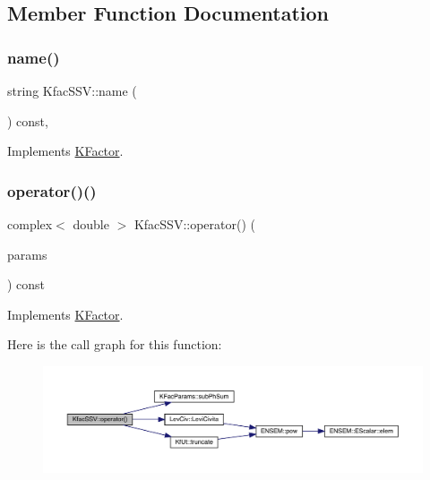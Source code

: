\subsection{Member Function Documentation}
\mbox{\label{classKfacSSV_a72d5e577525fa97365dbcfd4c5bea88d}} 
\subsubsection{\texorpdfstring{name()}{name()}}
{\footnotesize\ttfamily string Kfac\+S\+S\+V\+::name (\begin{DoxyParamCaption}{ }\end{DoxyParamCaption}) const\hspace{0.3cm}{\ttfamily [inline]}, {\ttfamily [virtual]}}



Implements \mbox{\hyperlink{classKFactor_ae578f8d6e4b525895427717da99cab6c}{K\+Factor}}.

\mbox{\label{classKfacSSV_ad9bddcf643847eebae9926bbc646c56c}} 
\subsubsection{\texorpdfstring{operator()()}{operator()()}}
{\footnotesize\ttfamily complex$<$ double $>$ Kfac\+S\+S\+V\+::operator() (\begin{DoxyParamCaption}\item[{const \mbox{\hyperlink{classKFacParams}{K\+Fac\+Params}} \&}]{params }\end{DoxyParamCaption}) const\hspace{0.3cm}{\ttfamily [virtual]}}



Implements \mbox{\hyperlink{classKFactor_a4273897de4ef590083c7ef208b8d0f18}{K\+Factor}}.

Here is the call graph for this function\+:
\nopagebreak
\begin{figure}[H]
\begin{center}
\leavevmode
\includegraphics[width=350pt]{d8/d76/classKfacSSV_ad9bddcf643847eebae9926bbc646c56c_cgraph}
\end{center}
\end{figure}



